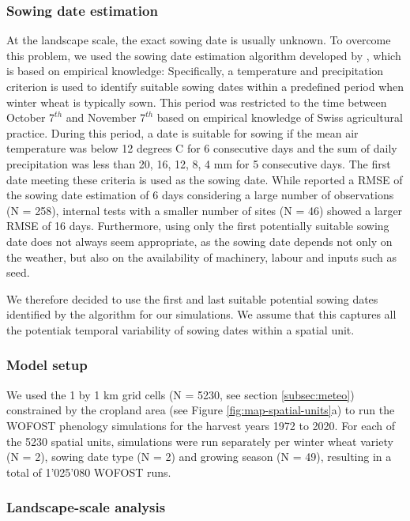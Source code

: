 \subsubsection{Sowing date estimation}
\label{subsubsec:sowing-date-estimation}
At the landscape scale, the exact sowing date is usually unknown. To overcome this problem, we used the sowing date estimation algorithm developed by \cite{holzkamper_spatial_2015}, which is based on empirical knowledge: Specifically, a temperature and precipitation criterion is used to identify suitable sowing dates within a predefined period when winter wheat is typically sown. This period was restricted to the time between October $7^{th}$ and November $7^{th}$ based on empirical knowledge of Swiss agricultural practice. During this period, a date is suitable for sowing if the mean air temperature was below 12 degrees C for 6 consecutive days and the sum of daily precipitation was less than 20, 16, 12, 8, 4 mm for 5 consecutive days. The first date meeting these criteria is used as the sowing date. While \cite{holzkamper_spatial_2015} reported a \gls{RMSE} of the sowing date estimation of 6 days considering a large number of observations (N = 258), internal tests with a smaller number of sites (N = 46) showed a larger \gls{RMSE} of 16 days. Furthermore, using only the first potentially suitable sowing date does not always seem appropriate, as the sowing date depends not only on the weather, but also on the availability of machinery, labour and inputs such as seed.

We therefore decided to use the first and last suitable potential sowing dates identified by the algorithm for our simulations. We assume that this captures all the potentiak temporal variability of sowing dates within a spatial unit.

\subsubsection{Model setup}
We used the 1 by 1 km grid cells (N = 5230, see section \ref{subsec:meteo}) constrained by the cropland area (see Figure \ref{fig:map-spatial-units}a) to run the \gls{WOFOST} phenology simulations for the harvest years 1972 to 2020. For each of the 5230 spatial units, simulations were run separately per winter wheat variety (N = 2), sowing date type (N = 2) and growing season (N = 49), resulting in a total of 1'025'080 \gls{WOFOST} runs.

\subsubsection{Landscape-scale analysis}

